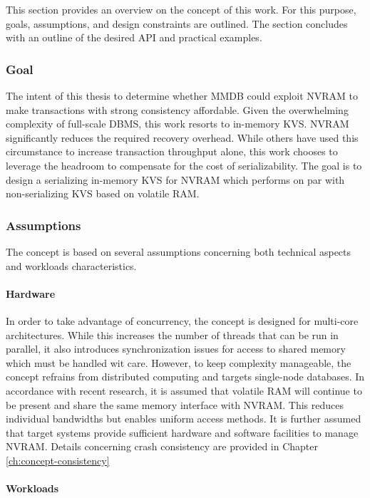 This section provides an overview on the concept of this work. For this purpose,
goals, assumptions, and design constraints are outlined. The section concludes
with an outline of the desired API and practical examples.

\subsubsection{Goal}

The intent of this thesis to determine whether MMDB could exploit NVRAM to make
transactions with strong consistency affordable. Given the overwhelming
complexity of full-scale DBMS, this work resorts to in-memory KVS. NVRAM
significantly reduces the required recovery overhead. While others have used
this circumstance to increase transaction throughput alone, this work chooses to
leverage the headroom to compensate for the cost of serializability. The goal is
to design a serializing in-memory KVS for NVRAM which performs on par with
non-serializing KVS based on volatile RAM.

\subsubsection{Assumptions}

The concept is based on several assumptions concerning both technical aspects
and workloads characteristics.

\paragraph{Hardware}

In order to take advantage of concurrency, the concept is designed for
multi-core architectures. While this increases the number of threads that can be
run in parallel, it also introduces synchronization issues for access to shared
memory which must be handled wit care. However, to keep complexity manageable,
the concept refrains from distributed computing and targets single-node
databases. In accordance with recent research, it is assumed that volatile RAM
will continue to be present and share the same memory interface with NVRAM. This
reduces individual bandwidths but enables uniform access methods. It is further
assumed that target systems provide sufficient hardware and software facilities
to manage NVRAM. Details concerning crash consistency are provided in Chapter
\ref{ch:concept-consistency}

\paragraph{Workloads}

